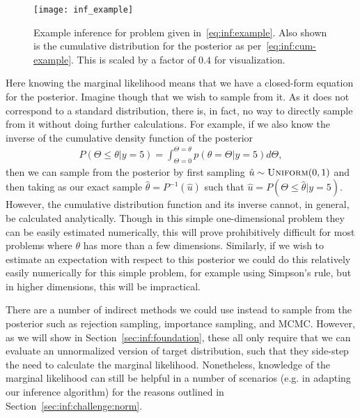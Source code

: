 \begin{wrapfigure}{r}{0.38\textwidth}
	\centering
	\texttt{[image: inf\_example]}
	\vspace{-6pt}
	\caption{Example inference for problem given
		in~\eqref{eq:inf:example}. Also shown is the cumulative distribution for
		the posterior as per~\eqref{eq:inf:cum-example}.  This is scaled by a factor
		of $0.4$ for visualization.  \label{fig:inf:inf-example}}
	\vspace{6pt}
\end{wrapfigure}
Here knowing the marginal likelihood means that we have a 
closed-form equation for the posterior.  Imagine though that we 
wish to sample from it.  As it does not correspond to a standard distribution,
 there is, in fact, no way
to directly sample from it without doing further calculations.  For example, if
we also know the inverse of the cumulative density function of the posterior
\begin{align}
\label{eq:inf:cum-example}
P(\Theta\le\theta | y=5) = \int_{\Theta=0}^{\Theta=\theta}  p(\theta=\Theta | y=5) d\Theta,
\end{align}
then we can sample from the posterior by first sampling $\hat{u} \sim \textsc{Uniform}(0,1)$ and
then taking as our exact sample $\hat{\theta} = P^{-1}(\hat{u})$ such that 
$\hat{u} = P(\Theta\le\hat{\theta} | y=5)$.  However, the cumulative distribution function
and its inverse cannot, in general, be calculated analytically.  Though in this simple 
one-dimensional
problem they can be easily estimated numerically, this will prove prohibitively difficult
for most problems where $\theta$ has more than a few dimensions.  Similarly, if we
wish to estimate an expectation with respect to this posterior we could do this relatively
easily numerically for this simple problem, for example using Simpson's rule, but in higher
dimensions, this will be impractical.

There are a number of indirect methods we could use instead to sample from the posterior
such as rejection sampling, importance sampling, and MCMC.  However, as we will show
in Section~\ref{sec:inf:foundation}, these all only require that we can evaluate an unnormalized version of
target distribution, such that they side-step the need to calculate the marginal 
likelihood.  Nonetheless, knowledge of the marginal likelihood can still be helpful in
a number of scenarios (e.g. in adapting our inference algorithm) for the reasons outlined in 
Section~\ref{sec:inf:challenge:norm}.